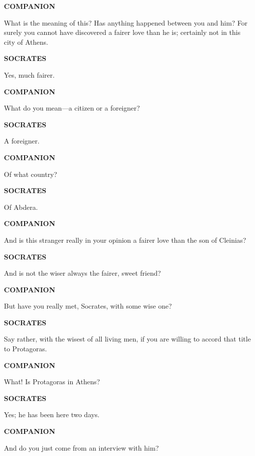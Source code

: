 \documentclass[11pt,letter]{article}
\begin{document}
\par \textbf{COMPANION}
\par   What is the meaning of this? Has anything happened between you and him? For surely you cannot have discovered a fairer love than he is; certainly not in this city of Athens.

\par \textbf{SOCRATES}
\par   Yes, much fairer.

\par \textbf{COMPANION}
\par   What do you mean—a citizen or a foreigner?

\par \textbf{SOCRATES}
\par   A foreigner.

\par \textbf{COMPANION}
\par   Of what country?

\par \textbf{SOCRATES}
\par   Of Abdera.

\par \textbf{COMPANION}
\par   And is this stranger really in your opinion a fairer love than the son of Cleinias?

\par \textbf{SOCRATES}
\par   And is not the wiser always the fairer, sweet friend?

\par \textbf{COMPANION}
\par   But have you really met, Socrates, with some wise one?

\par \textbf{SOCRATES}
\par   Say rather, with the wisest of all living men, if you are willing to accord that title to Protagoras.

\par \textbf{COMPANION}
\par   What! Is Protagoras in Athens?

\par \textbf{SOCRATES}
\par   Yes; he has been here two days.

\par \textbf{COMPANION}
\par   And do you just come from an interview with him?
\end{document}
